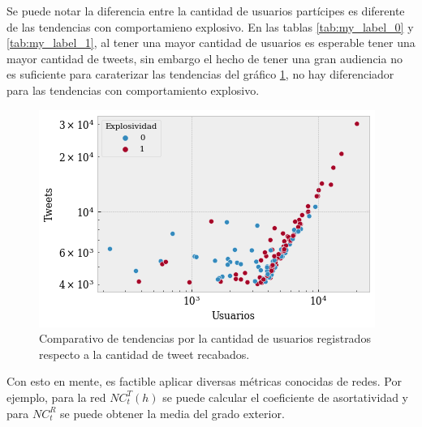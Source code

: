 \documentclass[../main.tex]{subfiles}
\begin{document}
Se puede notar la diferencia entre la cantidad de usuarios partícipes es diferente de las tendencias con comportamieno explosivo. En las tablas \ref{tab:my_label_0} y \ref{tab:my_label_1}, al tener una mayor cantidad de usuarios es esperable tener una mayor cantidad de tweets, sin embargo el hecho de tener una gran audiencia no es suficiente para caraterizar las tendencias del gráfico \ref{fig:resultados_comparativotweetsusuarios}, no hay diferenciador para las tendencias con comportamiento explosivo.

\begin{figure}
    \centering
    \includegraphics[scale = 0.8]{images/resultados_comparativoTweets.png}
    \caption{Comparativo de tendencias por la cantidad de usuarios registrados respecto a la cantidad de tweet recabados. }
    \label{fig:resultados_comparativotweetsusuarios}
\end{figure}

Con esto en mente, es factible aplicar diversas métricas conocidas de redes. Por ejemplo, para la red $NC_{t}^{T}(h)$ se puede calcular el coeficiente de asortatividad y para $NC_{t}^{R}$ se puede obtener la media del grado exterior.
\end{document}
